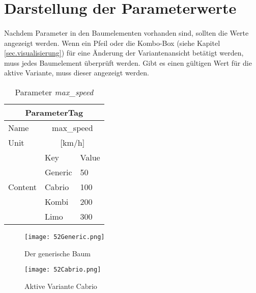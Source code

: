 \section{Darstellung der Parameterwerte}\label{sec.LoesungVisualisierung}
\paragraph{}

Nachdem Parameter in den Baumelementen vorhanden sind, sollten die Werte angezeigt werden. Wenn ein Pfeil oder die Kombo-Box (siehe Kapitel \ref{sec.visualisierung}) für eine Änderung der Variantenansicht betätigt werden, muss jedes Baumelement überprüft werden. Gibt es einen gültigen Wert für die aktive Variante, muss dieser angezeigt werden.\\

 
\begin{table}[h]
\begin{center}
	\begin{tabular}{|l||ll|}
	 \hline
	 \multicolumn{3}{|c|}{ParameterTag}\\
	 \hline\hline
	 Name		& \multicolumn{2}{|c|}{max\_speed}\\
	 \hline
	 Unit		& \multicolumn{2}{|c|}{[km/h]}\\
	 \hline
	 \multirow{5}{*}{Content}	&Key			&Value\\ \cline{2-3}
	 							&Generic		&50\\
	 							&Cabrio		&100\\
	 							&Kombi		&200\\
	 							&Limo		&300\\
	 \hline
	\end{tabular}
	\caption{Parameter \textit{max\_speed}}
	\label{table:ParameterTagStruktur2}
\end{center}
\end{table}


\begin{figure}[h!]
\centering
\begin{minipage}{.5\textwidth}
  \centering
  \texttt{[image: 52Generic.png]}
  \caption{Der generische Baum}
  \label{ttn.52Generic}
\end{minipage}%
\begin{minipage}{.5\textwidth}
  \centering
  \texttt{[image: 52Cabrio.png]}
  \caption{Aktive Variante Cabrio}
  \label{ttn.52Cabrio}
\end{minipage}
\end{figure}


